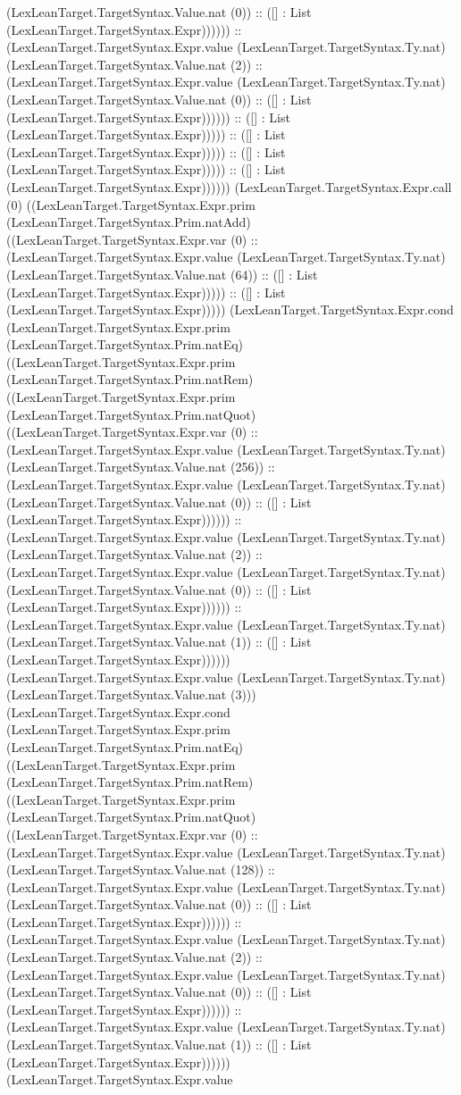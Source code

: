\documentclass[11pt]{article}
\begin{document}
(LexLeanTarget.TargetSyntax.Value.nat (0)) :: ([] : List (LexLeanTarget.TargetSyntax.Expr)))))) :: (LexLeanTarget.TargetSyntax.Expr.value (LexLeanTarget.TargetSyntax.Ty.nat) (LexLeanTarget.TargetSyntax.Value.nat (2)) :: (LexLeanTarget.TargetSyntax.Expr.value (LexLeanTarget.TargetSyntax.Ty.nat) (LexLeanTarget.TargetSyntax.Value.nat (0)) :: ([] : List (LexLeanTarget.TargetSyntax.Expr)))))) :: ([] : List (LexLeanTarget.TargetSyntax.Expr))))) :: ([] : List (LexLeanTarget.TargetSyntax.Expr))))) :: ([] : List (LexLeanTarget.TargetSyntax.Expr))))) :: ([] : List (LexLeanTarget.TargetSyntax.Expr)))))) (LexLeanTarget.TargetSyntax.Expr.call (0) ((LexLeanTarget.TargetSyntax.Expr.prim (LexLeanTarget.TargetSyntax.Prim.natAdd) ((LexLeanTarget.TargetSyntax.Expr.var (0) :: (LexLeanTarget.TargetSyntax.Expr.value (LexLeanTarget.TargetSyntax.Ty.nat) (LexLeanTarget.TargetSyntax.Value.nat (64)) :: ([] : List (LexLeanTarget.TargetSyntax.Expr))))) :: ([] : List (LexLeanTarget.TargetSyntax.Expr))))) (LexLeanTarget.TargetSyntax.Expr.cond (LexLeanTarget.TargetSyntax.Expr.prim (LexLeanTarget.TargetSyntax.Prim.natEq) ((LexLeanTarget.TargetSyntax.Expr.prim (LexLeanTarget.TargetSyntax.Prim.natRem) ((LexLeanTarget.TargetSyntax.Expr.prim (LexLeanTarget.TargetSyntax.Prim.natQuot) ((LexLeanTarget.TargetSyntax.Expr.var (0) :: (LexLeanTarget.TargetSyntax.Expr.value (LexLeanTarget.TargetSyntax.Ty.nat) (LexLeanTarget.TargetSyntax.Value.nat (256)) :: (LexLeanTarget.TargetSyntax.Expr.value (LexLeanTarget.TargetSyntax.Ty.nat) (LexLeanTarget.TargetSyntax.Value.nat (0)) :: ([] : List (LexLeanTarget.TargetSyntax.Expr)))))) :: (LexLeanTarget.TargetSyntax.Expr.value (LexLeanTarget.TargetSyntax.Ty.nat) (LexLeanTarget.TargetSyntax.Value.nat (2)) :: (LexLeanTarget.TargetSyntax.Expr.value (LexLeanTarget.TargetSyntax.Ty.nat) (LexLeanTarget.TargetSyntax.Value.nat (0)) :: ([] : List (LexLeanTarget.TargetSyntax.Expr)))))) :: (LexLeanTarget.TargetSyntax.Expr.value (LexLeanTarget.TargetSyntax.Ty.nat) (LexLeanTarget.TargetSyntax.Value.nat (1)) :: ([] : List (LexLeanTarget.TargetSyntax.Expr)))))) (LexLeanTarget.TargetSyntax.Expr.value (LexLeanTarget.TargetSyntax.Ty.nat) (LexLeanTarget.TargetSyntax.Value.nat (3))) (LexLeanTarget.TargetSyntax.Expr.cond (LexLeanTarget.TargetSyntax.Expr.prim (LexLeanTarget.TargetSyntax.Prim.natEq) ((LexLeanTarget.TargetSyntax.Expr.prim (LexLeanTarget.TargetSyntax.Prim.natRem) ((LexLeanTarget.TargetSyntax.Expr.prim (LexLeanTarget.TargetSyntax.Prim.natQuot) ((LexLeanTarget.TargetSyntax.Expr.var (0) :: (LexLeanTarget.TargetSyntax.Expr.value (LexLeanTarget.TargetSyntax.Ty.nat) (LexLeanTarget.TargetSyntax.Value.nat (128)) :: (LexLeanTarget.TargetSyntax.Expr.value (LexLeanTarget.TargetSyntax.Ty.nat) (LexLeanTarget.TargetSyntax.Value.nat (0)) :: ([] : List (LexLeanTarget.TargetSyntax.Expr)))))) :: (LexLeanTarget.TargetSyntax.Expr.value (LexLeanTarget.TargetSyntax.Ty.nat) (LexLeanTarget.TargetSyntax.Value.nat (2)) :: (LexLeanTarget.TargetSyntax.Expr.value (LexLeanTarget.TargetSyntax.Ty.nat) (LexLeanTarget.TargetSyntax.Value.nat (0)) :: ([] : List (LexLeanTarget.TargetSyntax.Expr)))))) :: (LexLeanTarget.TargetSyntax.Expr.value (LexLeanTarget.TargetSyntax.Ty.nat) (LexLeanTarget.TargetSyntax.Value.nat (1)) :: ([] : List (LexLeanTarget.TargetSyntax.Expr)))))) (LexLeanTarget.TargetSyntax.Expr.value 
\end{document}
